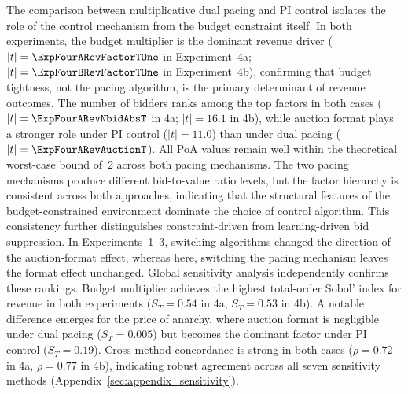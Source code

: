The comparison between multiplicative dual pacing and PI control isolates the role of the control mechanism from the budget constraint itself. In both experiments, the budget multiplier is the dominant revenue driver ($|t| = \ExpFourARevFactorTOne$ in Experiment~4a; $|t| = \ExpFourBRevFactorTOne$ in Experiment~4b), confirming that budget tightness, not the pacing algorithm, is the primary determinant of revenue outcomes. The number of bidders ranks among the top factors in both cases ($|t| = \ExpFourARevNbidAbsT$ in 4a; $|t| = 16.1$ in 4b), while auction format plays a stronger role under PI control ($|t| = 11.0$) than under dual pacing ($|t| = \ExpFourARevAuctionT$). All PoA values remain well within the theoretical worst-case bound of~2 across both pacing mechanisms. The two pacing mechanisms produce different bid-to-value ratio levels, but the factor hierarchy is consistent across both approaches, indicating that the structural features of the budget-constrained environment dominate the choice of control algorithm. This consistency further distinguishes constraint-driven from learning-driven bid suppression. In Experiments~1--3, switching algorithms changed the direction of the auction-format effect, whereas here, switching the pacing mechanism leaves the format effect unchanged. Global sensitivity analysis independently confirms these rankings. Budget multiplier achieves the highest total-order Sobol' index for revenue in both experiments ($S_T = 0.54$ in 4a, $S_T = 0.53$ in 4b). A notable difference emerges for the price of anarchy, where auction format is negligible under dual pacing ($S_T = 0.005$) but becomes the dominant factor under PI control ($S_T = 0.19$). Cross-method concordance is strong in both cases ($\rho = 0.72$ in 4a, $\rho = 0.77$ in 4b), indicating robust agreement across all seven sensitivity methods (Appendix~\ref{sec:appendix_sensitivity}).
